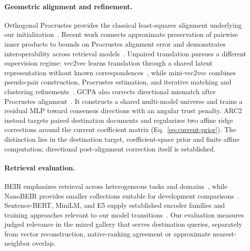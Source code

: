 \paragraph{Geometric alignment and refinement.}
Orthogonal Procrustes provides the classical least-squares alignment underlying our initialization~\cite{schonemann1966procrustes}.
Recent work connects approximate preservation of pairwise inner products to bounds on Procrustes alignment error and demonstrates interoperability across retrieval models~\cite{maystre2025procrustes}.
Unpaired translation pursues a different supervision regime: vec2vec learns translation through a shared latent representation without known correspondences~\cite{jha2025geometry}, while mini-vec2vec combines pseudo-pair construction, Procrustes estimation, and iterative matching and clustering refinements~\cite{dar2025mini}.
GCPA also corrects directional mismatch after Procrustes alignment~\cite{gcpa2026}.
It constructs a shared multi-model universe and trains a residual MLP toward consensus directions with an angular trust penalty.
ARC2 instead targets paired destination documents and regularizes two affine ridge corrections around the current coefficient matrix (Eq.~\ref{eq:current-prior}).
The distinction lies in the destination target, coefficient-space prior and finite affine computation; directional post-alignment correction itself is established.

\paragraph{Retrieval evaluation.}
BEIR emphasizes retrieval across heterogeneous tasks and domains~\cite{beir2021}, while NanoBEIR provides smaller collections suitable for development comparisons~\cite{nanobeir}.
Sentence-BERT, MiniLM, and E5 supply established encoder families and training approaches relevant to our model transitions~\cite{sbert2019,minilm2020,e52022}.
Our evaluation measures judged relevance in the mixed gallery that serves destination queries, separately from vector reconstruction, native-ranking agreement or approximate nearest-neighbor overlap.
